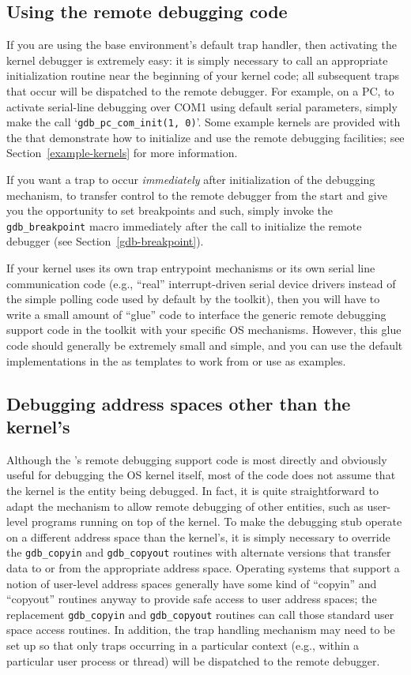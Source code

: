 \subsection{Using the remote debugging code}
\label{gdb-using}

If you are using the base environment's default trap handler,
then activating the kernel debugger is extremely easy:
it is simply necessary to call an appropriate initialization routine
near the beginning of your kernel code;
all subsequent traps that occur will be dispatched to the remote debugger.
For example, on a PC,
to activate serial-line debugging over COM1 using default serial parameters,
simply make the call `{\tt gdb_pc_com_init(1, 0)}'.
Some example kernels are provided with the \oskit{}
that demonstrate how to initialize and use the remote debugging facilities;
see Section~\ref{example-kernels} for more information.

If you want a trap to occur \emph{immediately}
after initialization of the debugging mechanism,
to transfer control to the remote debugger from the start
and give you the opportunity to set breakpoints and such,
simply invoke the {\tt gdb_breakpoint} macro
immediately after the call to initialize the remote debugger
(see Section~\ref{gdb-breakpoint}).

If your kernel uses its own trap entrypoint mechanisms
or its own serial line communication code
(e.g., ``real'' interrupt-driven serial device drivers
instead of the simple polling code used by default by the toolkit),
then you will have to write a small amount of ``glue'' code
to interface the generic remote debugging support code in the toolkit
with your specific OS mechanisms.
However, this glue code should generally be extremely small and simple,
and you can use the default implementations in the \oskit{}
as templates to work from or use as examples.

\subsection{Debugging address spaces other than the kernel's}

Although the \oskit{}'s remote debugging support code
is most directly and obviously useful for debugging the OS kernel itself,
most of the code does not assume that the kernel is the entity being debugged.
In fact, it is quite straightforward to adapt the mechanism
to allow remote debugging of other entities,
such as user-level programs running on top of the kernel.
To make the debugging stub operate
on a different address space than the kernel's,
it is simply necessary to override
the {\tt gdb_copyin} and {\tt gdb_copyout} routines
with alternate versions that transfer data
to or from the appropriate address space.
Operating systems that support a notion of user-level address spaces
generally have some kind of ``copyin'' and ``copyout'' routines anyway
to provide safe access to user address spaces;
the replacement {\tt gdb_copyin} and {\tt gdb_copyout} routines
can call those standard user space access routines.
In addition, the trap handling mechanism may need to be set up
so that only traps occurring in a particular context
(e.g., within a particular user process or thread)
will be dispatched to the remote debugger.

